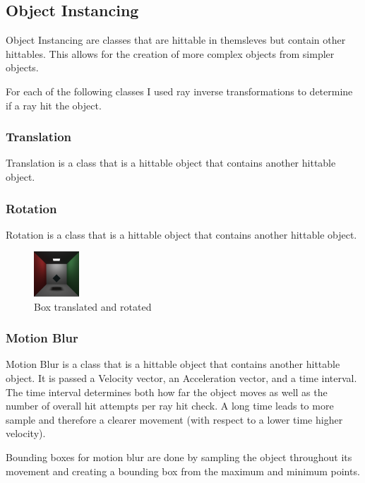 \documentclass{article}
\begin{document}
    \subsection{Object Instancing}
    Object Instancing are classes that are hittable in themsleves but contain other hittables. This allows for the creation of more complex objects from simpler objects. \par
    For each of the following classes I used ray inverse transformations to determine if a ray hit the object. \par


        \subsubsection{Translation}
        Translation is a class that is a hittable object that contains another hittable object. \par



        \subsubsection{Rotation}
        Rotation is a class that is a hittable object that contains another hittable object. \par
        \begin{figure}[h!]
            \centering
            \includegraphics[width=0.15\textwidth]{samples/Instancing.png}
            \caption{Box translated and rotated}
        \end{figure}


        \subsubsection{Motion Blur}
        Motion Blur is a class that is a hittable object that contains another hittable object. It is passed a Velocity vector, an Acceleration vector, and a time interval. The time interval determines both how far the object moves as well as the number of overall hit attempts per ray hit check. A long time leads to more sample and therefore a clearer movement (with respect to a lower time higher velocity).\par 
        Bounding boxes for motion blur are done by sampling the object throughout its movement and creating a bounding box from the maximum and minimum points. \par
\end{document}
